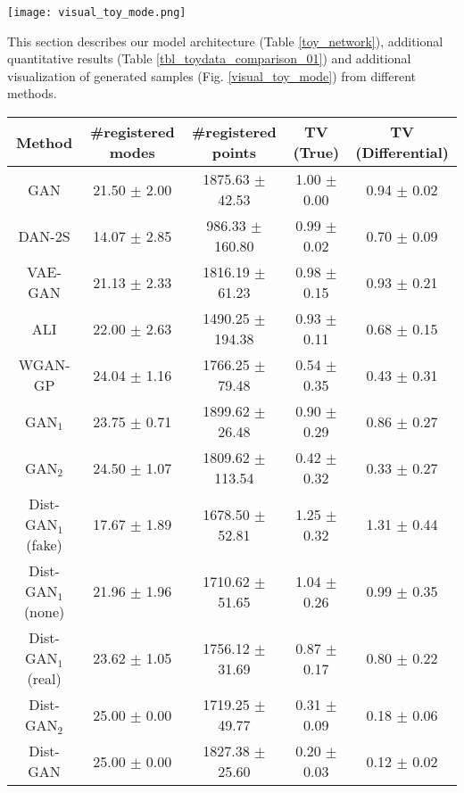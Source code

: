 \documentclass[runningheads]{llncs}
\begin{document}
\begin{figure*}
\centering
\texttt{[image: visual\_toy\_mode.png]}
\caption{Visualizing samples generated by different methods on the synthetic dataset.}
\label{visual_toy_mode}
\end{figure*}

This section describes our model architecture (Table \ref{toy_network}), additional quantitative results (Table \ref{tbl_toydata_comparison_01}) and additional visualization of generated samples (Fig. \ref{visual_toy_mode}) from different methods. 

\begin{table*}
\centering
\footnotesize
\caption{Synthetic data results. Columns indicate the number of covered modes, and the number of registered samples among 2000 generated samples, and two types of Total Variation (TV). We evaluate three versions of Dist-GAN$_1$ regarding reconstructed samples as ``fake", ``none" or ``real" samples.}
\begin{tabular}{c | c | c | c | c}
Method & \#registered modes & \#registered points & TV (True) & TV (Differential) \\ 
\hline
\hline
GAN \cite{goodfellow-nisp-2014}     & 21.50 $\pm$ 2.00     & 1875.63 $\pm$ 42.53  & 1.00 $\pm$ 0.00 & 0.94 $\pm$ 0.02  \\
\hline
DAN-2S \cite{li-arxiv-2017}         & 14.07 $\pm$ 2.85     & 986.33 $\pm$ 160.80  & 0.99 $\pm$ 0.02 & 0.70 $\pm$ 0.09 \\
\hline
VAE-GAN \cite{larsen-arxiv-2015} & 21.13 $\pm$ 2.33 & 1816.19 $\pm$ 61.23 & 0.98 $\pm$ 0.15 & 0.93 $\pm$ 0.21   \\
\hline
ALI \cite{dumoulin-arxiv-2016}      & 22.00 $\pm$ 2.63     & 1490.25 $\pm$ 194.38  & 0.93 $\pm$ 0.11 & 0.68 $\pm$ 0.15  \\
\hline
WGAN-GP \cite{gulrajani-arxiv-2017}   & 24.04 $\pm$ 1.16    & 1766.25 $\pm$ 79.48   & 0.54 $\pm$ 0.35 & 0.43 $\pm$ 0.31  \\
\hline
GAN$_1$        & 23.75 $\pm$ 0.71 & 1899.62 $\pm$ 26.48 & 0.90 $\pm$ 0.29 & 0.86 $\pm$ 0.27 \\
\hline
GAN$_2$        & 24.50 $\pm$ 1.07 & 1809.62 $\pm$ 113.54 & 0.42 $\pm$ 0.32 & 0.33 $\pm$ 0.27 \\
\hline
Dist-GAN$_1$ (fake)        &  17.67 $\pm$ 1.89 &  1678.50 $\pm$  52.81 &  1.25 $\pm$ 0.32 & 1.31 $\pm$  0.44 \\
\hline
Dist-GAN$_1$ (none)        &  21.96 $\pm$ 1.96 &  1710.62 $\pm$ 51.65 &  1.04 $\pm$ 0.26 &  0.99 $\pm$ 0.35 \\
\hline
Dist-GAN$_1$ (real)        &  23.62 $\pm$ 1.05 &  1756.12 $\pm$ 31.69 &  0.87 $\pm$ 0.17 &  0.80 $\pm$ 0.22 \\
\hline
Dist-GAN$_2$        & 25.00 $\pm$ 0.00 & 1719.25 $\pm$ 49.77 & 0.31 $\pm$ 0.09 & 0.18 $\pm$ 0.06 \\
\hline
Dist-GAN       & 25.00 $\pm$ 0.00 & 1827.38 $\pm$ 25.60 & 0.20 $\pm$ 0.03 & 0.12 $\pm$ 0.02\\
\end{tabular}
\label{tbl_toydata_comparison_01}
\end{table*}
\end{document}
